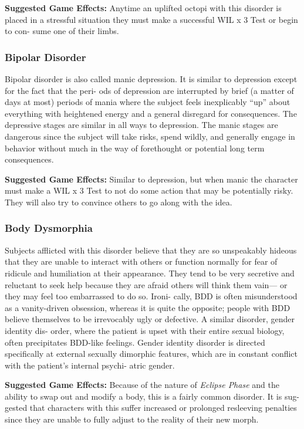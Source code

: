 \textbf{Suggested Game Effects: }Anytime an uplifted octopi 
with this disorder is placed in a stressful situation they 
must make a successful WIL x 3 Test or begin to con-
sume one of their limbs.

\subsubsection{Bipolar Disorder}

Bipolar disorder is also called manic depression. It is 
similar to depression except for the fact that the peri-
ods of depression are interrupted by brief (a matter of 
days at most) periods of mania where the subject feels 
inexplicably ``up'' about everything with heightened 
energy and a general disregard for consequences. The 
depressive stages are similar in all ways to depression. 
The manic stages are dangerous since the subject 
will take risks, spend wildly, and generally engage in 
behavior without much in the way of forethought or 
potential long term consequences.

\textbf{Suggested Game Effects: }Similar to depression, but 
when manic the character must make a WIL x 3 Test 
to not do some action that may be potentially risky. 
They will also try to convince others to go along with 
the idea.

\subsubsection{Body Dysmorphia}

Subjects afflicted with this disorder believe that they 
are so unspeakably hideous that they are unable to 
interact with others or function normally for fear of 
ridicule and humiliation at their appearance. They 
tend to be very secretive and reluctant to seek help 
because they are afraid others will think them vain—
or they may feel too embarrassed to do so. Ironi-
cally, BDD is often misunderstood as a vanity-driven 
obsession, whereas it is quite the opposite; people 
with BDD believe themselves to be irrevocably ugly 
or defective. A similar disorder, gender identity dis-
order, where the patient is upset with their entire 
sexual biology, often precipitates BDD-like feelings. 
Gender identity disorder is directed specifically  at 
external sexually dimorphic features, which are in 
constant conflict with the patient's internal psychi-
atric gender.

\textbf{Suggested Game Effects: }Because of the nature of 
\textit{Eclipse Phase} and the ability to swap out and modify 
a body, this is a fairly common disorder. It is sug-
gested that characters with this suffer increased or 
prolonged resleeving penalties since they are unable 
to fully adjust to the reality of their new morph.

